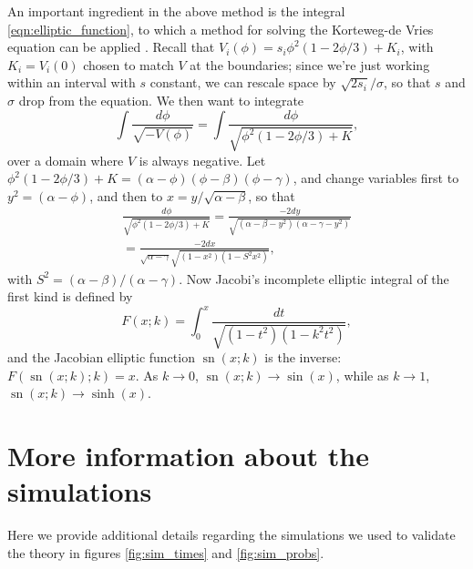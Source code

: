 \documentclass{article}
\newcommand{\citep}[1]{\cite{#1}}
\DeclareMathOperator{\sn}{sn}
\begin{document}
An important ingredient in the above method is the integral \eqref{eqn:elliptic_function},
to which a method for solving the Korteweg-de Vries equation can be applied \citep{NEQwiki}.
Recall that $V_i(\phi) =  s_i \phi^2(1-2\phi/3) + K_i$, with $K_i = V_i(0)$ chosen to match $V$ at the boundaries;
since we're just working within an interval with $s$ constant, we can rescale space by $\sqrt{2 s_i}/\sigma$,
so that $s$ and $\sigma$ drop from the equation.
We then want to integrate
\[
    \int \frac{ d\phi }{ \sqrt{-V(\phi)} } = 
         \int \frac{ d\phi }{ \sqrt{ \phi^2 (1-2\phi/3) + K } } ,
\]
over a domain where $V$ is always negative.
Let $\phi^2(1-2\phi/3)+K = (\alpha-\phi)(\phi-\beta)(\phi-\gamma)$,
and change variables first to $y^2=(\alpha-\phi)$, 
and then to $x = y/\sqrt{\alpha-\beta}$, so that
\begin{align*}
    \frac{ d\phi }{ \sqrt{ \phi^2 (1-2\phi/3) + K } } 
        = \frac{ - 2 dy }{ \sqrt{ (\alpha-\beta-y^2) (\alpha-\gamma-y^2) } } \\
        = \frac{ - 2 dx }{ \sqrt{\alpha-\gamma} \sqrt{ (1-x^2) (1-S^2 x^2) } } ,
\end{align*}
with $S^2 = (\alpha-\beta)/(\alpha-\gamma)$.
Now Jacobi's incomplete elliptic integral of the first kind is defined by
\[
    F(x;k) = \int_0^x \frac{dt}{\sqrt{ (1-t^2)(1-k^2t^2) }} ,
\]
and the Jacobian elliptic function $\sn(x;k)$ is the inverse: $F(\sn(x;k);k) = x$.
As $k \to 0$, $\sn(x;k) \to \sin(x)$, while as $k \to 1$, $\sn(x;k) \to \sinh(x)$.




\section{More information about the simulations}
\label{apx:parameter_tables}

Here we provide additional details regarding the simulations we used
to validate the theory in figures \ref{fig:sim_times} and \ref{fig:sim_probs}.
\end{document}
